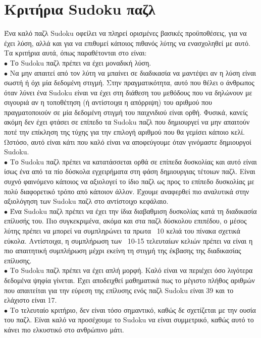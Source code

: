 \documentclass[oneside,12pt]{book}
\theoremstyle{definition}
\begin{document}
\section{Κριτήρια Sudoku παζλ}

Ένα καλό παζλ Sudoku οφείλει να πληρεί ορισμένες βασικές προϋποθέσεις, για να έχει λύση, αλλά και για να επιθυμεί κάποιος πιθανός λύτης να ενασχοληθεί με αυτό. Τα κριτήρια αυτά, όπως παραθέτονται στο \cite{9} είναι: \\
\(\bullet\) Το Sudoku παζλ πρέπει να έχει μοναδική λύση. \\
\(\bullet\) Να μην απαιτεί από τον λύτη να μπαίνει σε διαδικασία να μαντέψει αν η λύση είναι σωστή ή όχι μία δεδομένη στιγμή. Στην πραγματικότητα, αυτό που θέλει ο άνθρωπος όταν λύνει ένα Sudoku είναι να έχει στη διάθεση του μεθόδους που να δηλώνουν με σιγουριά αν η τοποθέτηση (ή αντίστοιχα η απόρριψη) του αριθμού  που πραγματοποιούν σε μία δεδομένη στιγμή του παιχνιδιού είναι ορθή. Φυσικά, κανείς ακόμη δεν έχει φτάσει σε επίπεδο τα Sudoku παζλ που δημιουργεί να μην απαιτούν ποτέ την επίκληση της τύχης για την επιλογή αριθμού που θα γεμίσει κάποιο κελί. Ωστόσο, αυτό είναι κάτι που καλό είναι να αποφεύγουμε όταν γινόμαστε δημιουργοί Sudoku. \\
\(\bullet\) Το Sudoku παζλ πρέπει να κατατάσσεται ορθά σε επίπεδα δυσκολίας και αυτό είναι ίσως ένα από τα πίο δύσκολα εγχειρήματα στη φάση δημιουργιας τέτοιων παζλ. Είναι συχνό φαινόμενο κάποιος να αξιολογεί το ίδιο παζλ ως προς το επίπεδο δυσκολίας με πολύ διαφορετικό τρόπο από κάποιον άλλον. Έχουμε αναφερθεί πιο αναλυτικά στην αξιολόγηση των Sudoku παζλ στο αντίστοιχο κεφάλαιο. \\
\(\bullet\) Ένα Sudoku παζλ πρέπει να έχει την ίδια διαβαθμιση δυσκολίας κατά τη διαδικασία επίλυσής του. Πιο συγκεκριμένα, ακόμα και στα παζλ δύσκολου επιπέδου, ο μέσος λύτης πρέπει να μπορεί να συμπληρώνει τα πρωτα ~10 κελιά του πίνακα σχετικά εύκολα. Αντίστοιχα, η συμπλήρωση των ~10-15 τελευταίων κελιών πρέπει να είναι η πιο απαιτητική συμπλήρωση μέχρι εκείνη τη στιγμή της έκβασης της διαδικασίας επίλυσης. \\
\(\bullet\) Το Sudoku παζλ πρέπει να έχει απλή μορφή. Καλό είναι να περιέχει όσο λιγότερα δεδομένα ψηφία γίνεται. Έχει αποδειχθεί μαθηματικά πως το μέγιστο πλήθος αριθμών που απαιτείται για την εύρεση της επίλυσης ενός παζλ Sudoku είναι 39 και το ελάχιστο είναι 17. \\
\(\bullet\) Το τελευταίο κριτήριο, δεν είναι τόσο σημαντικό, καθώς δε σχετίζεται με την ουσία του παζλ. Είναι καλό να προσέχουμε το Sudoku να είναι συμμετρικό, καθώς αυτό το κάνει πιο ελκυστικό στο ανθρώπινο μάτι. \par
\end{document}
